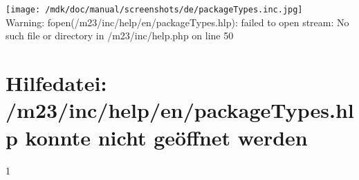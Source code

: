 \section{}
\texttt{[image: /mdk/doc/manual/screenshots/de/packageTypes.inc.jpg]} \\
 Warning: fopen(/m23/inc/help/en/packageTypes.hlp): failed to open stream: No such file or directory in /m23/inc/help.php on line 50 \section{Hilfedatei: /m23/inc/help/en/packageTypes.hlp konnte nicht ge\"offnet werden}
1 

